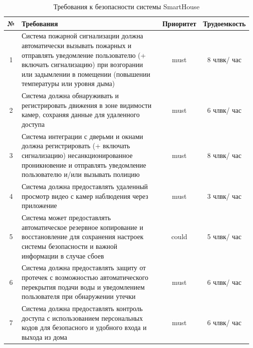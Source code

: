 \documentclass{article}
\begin{document}
\begin{table}[H]
    \centering
    \begin{tabular}{|c|p{10cm}|c|c|}
    \hline
        № & \centering Требования & Приоритет & Трудоемкость \\ \hline
        1 & Система пожарной сигнализации должна автоматически вызывать пожарных и отправлять уведомление пользователю (+ включать сигнализацию) при возгорании или задымлении в помещении (повышении температуры или уровня дыма) & must & 8 члвк/ час \\ \hline
        2 & Система должна обнаруживать и регистрировать движения в зоне видимости камер, сохраняя данные для удаленного доступа & must & 6 члвк/ час \\ \hline
        3 & Система интеграции с дверьми и окнами должна регистрировать (+ включать сигнализацию) несанкционированное проникновение и отправлять уведомление пользователю и/или вызывать полицию & must & 8 члвк/ час \\ \hline
        4 & Система должна предоставлять удаленный просмотр видео с камер наблюдения через приложение & must & 3 члвк/ час \\ \hline
        5 & Система может предоставлять автоматическое резервное копирование и восстановление для сохранения настроек системы безопасности и важной информации в случае сбоев & could & 5 члвк/ час \\ \hline
        6 & Система должна предоставлять защиту от протечек с возможностью автоматического перекрытия подачи воды и уведомлением пользователя при обнаружении утечки & must & 6 члвк/ час \\ \hline
        7 & Система должна предоставлять контроль доступа с использованием персональных кодов для безопасного и удобного входа и выхода из дома & must & 6 члвк/ час \\ \hline
    \end{tabular}
    \caption{Требования к безопасности системы SmartHouse}
\end{table}
\end{document}
